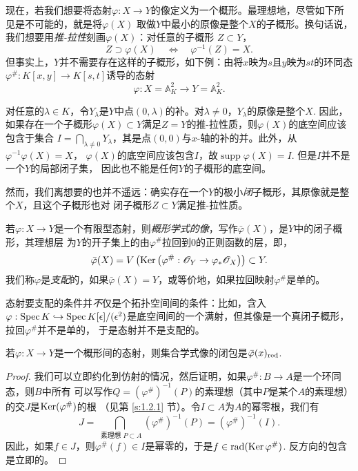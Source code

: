 现在，若我们想要将态射$\varphi:X\to Y$的像定义为一个概形。最理想地，尽管如下所见是不可能的，就是将$\varphi(X)$
取做$Y$中最小的原像是整个$X$的子概形。换句话说，我们想要用\textit{推-拉性}刻画$\varphi(X)$：对任意的子概形
$Z\subset Y$，
\[
    Z \supset \varphi(X) \quad \Longleftrightarrow \quad \varphi^{-1}(Z)=X.
\]
但事实上，$Y$并不需要存在这样的子概形，如下例：由将$x$映为$s$且$y$映为$st$的环同态
$\varphi^{\#}: K[x, y] \rightarrow K[s, t]$诱导的态射
\[
    \varphi: X=\mathbb{A}_K^2 \longrightarrow Y=\mathbb{A}_K^2.
\]



对任意的$\lambda\in K$，令$Y_\lambda$是$Y$中点$(0,\lambda)$的补。对$\lambda \neq 0$，$Y_\lambda$的原像是整个$X$.
因此，如果存在一个子概形$\varphi(X)\subset Y$满足$Z=Y$的推-拉性质，则$\varphi(X)$的底空间应该包含于集合
$I=\bigcap_{\lambda\neq 0}Y_\lambda$，其是点$(0,0)$与$x$-轴的补的并。此外，从$\varphi^{-1}\varphi(X)=X$，
$\varphi(X)$的底空间应该包含$I$，故$\operatorname{supp}\varphi(X)=I$. 但是$I$并不是一个$Y$的局部闭子集，
因此也不能是任何$Y$的子概形的底空间。

然而，我们离想要的也并不遥远：确实存在一个$Y$的极小\textit{闭}子概形，其原像就是整个$X$，且这个子概形也对
闭子概形$Z\subset Y$满足推-拉性质。

\begin{defi}\label{defi:5.2}
若$\varphi:X\to Y$是一个有限型态射，则\textit{概形学式的像}，写作$\bar\varphi(X)$，是$Y$中的闭子概形，其理想层
为$Y$的开子集上的由$\varphi^\#$拉回到$0$的正则函数的层，即，
\[
    \bar{\varphi}(X)=V\left(\operatorname{Ker}
    \left(\varphi^{\#}: \mathscr{O}_Y \rightarrow \varphi_* \mathscr{O}_X\right)\right) \subset Y.
\]
我们称$\varphi$是\textit{支配}的，如果$\bar\varphi(X)=Y$，或等价地，如果拉回映射$\varphi^\#$是单的。
\end{defi}

态射要支配的条件并\textit{不}仅是个拓扑空间间的条件：比如，含入$\varphi:\operatorname{Spec} K\hookrightarrow 
\operatorname{Spec} K[\epsilon]/(\epsilon^2)$是底空间间的一个满射，但其像是一个真闭子概形，拉回$\varphi^\#$并不是单的，
于是态射并不是支配的。

\begin{pro}\label{pro:5.3}
若$\varphi:X\to Y$是一个概形间的态射，则集合学式像的闭包是$\bar\varphi(x)_{\rm{red}}$.
\end{pro}

\begin{proof}
我们可以立即约化到仿射的情况，然后证明，如果$\varphi^\#:B\to A$是一个环同态，则$B$中所有
可以写作$Q=(\varphi^\#)^{-1}(P)$的素理想（其中$P$是某个$A$的素理想）的交$J$是$\operatorname{Ker}(\varphi^\#)$的根
（见第 \ref{s:1.2.1} 节）。令$I\subset A$为$A$的幂零根，我们有 
\[
    J=\bigcap_{\text { 素理想 } P \subset A}\left(\varphi^{\#}\right)^{-1}(P)=\left(\varphi^{\#}\right)^{-1}(I) .
\]
因此，如果$f\in J$，则$\varphi^\#(f)\in I$是幂零的，于是$f\in \operatorname{rad}(\operatorname{Ker} \varphi^\#)$. 反方向的包含
是立即的。
\end{proof}

